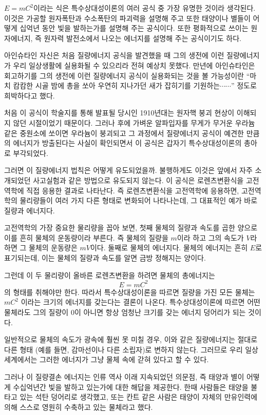 $E=mC^2$이라는 식은 특수상대성이론의 여러 공식 중 가장 유명한 것이라 생각된다.
이것은
가공할 원자폭탄과 수소폭탄의 파괴력을 설명해 주고 또한 태양이나 별들이 어떻게 십억년 동안
빛을 발하는가를 설명해 주는 공식이다. 또한 평화적으로 쓰이는 원자에너지, 즉 원자력
발전소에서 나오는 에너지를 설명해 주는 공식이기도 하다.

  아인슈타인 자신은 처음 질량에너지 공식을 발견했을 때 그의 생전에 이런 질량에너지가 우리
일상생활에 실용화될 수 있으리라 전혀 예상치 못했다. 만년에 아인슈타인은 회고하기를 그의
생전에 이런 질량에너지 공식이 실용화되는 것을 볼 가능성이란 ``마치 캄캄한 시골 밤에 총을
쏘아 우연히 지나가던 새가 잡히기를 기원하는$\cdots\cdots$'' 정도로 희박하다고 했다.

  처음 이 공식이 학술지를 통해 발표될 당시인 1910년대는 원자핵 붕괴 현상이 이해되지 않던
시절이었기 때문이다. 그러나 후에 가벼운 알파입자를 무게가 무거운 우라늄 같은 중원소에
쏘이면 우라늄이 붕괴되고 그 과정에서 질량에너지 공식이 예견한 만큼의 에너지가 방출된다는
사실이 확인되면서 이 공식은 갑자기 특수상대성이론의 총아로 부각되었다.

  그러면 이 질량에너지 법칙은 어떻게 유도되었을까. 불행하게도 이것은 앞에서 자주
소개되었던 사고실험과 같은 방법으로 유도되지 않는다. 이 공식은 로렌츠변환식을 고전역학에
직접 응용한 결과로 나타난다. 즉 로렌츠변환식을 고전역학에 응용하면, 고전역학의 물리량들이
여러 가지 다른 형태로 변화되어 나타나는데, 그 대표적인 예가 바로 질량과 에너지다.

  고전역학의 가장 중요한 물리량을 꼽아 보면, 첫째 물체의 질량과 속도를 곱한 양으로 이를
흔히 물체의 운동량이라 부른다. 즉 물체의 질량을 $m$이라 하고 그의 속도가 $V$라 하면 그 물체의
운동량은 $mV$이다. 둘째로 물체의 에너지다. 물체의 에너지는 흔히 $E$로 표기되는데, 이는 물체의
질량과 속도를 알면 금방 정해지는 양이다.

  그런데 이 두 물리량이 올바른 로렌츠변환을 하려면 물체의 총에너지는
$$ E= mC^2$$
  의 형태를 취해야만 한다. 따라서 특수상대성이론을 따르면 질량을 가진 모든 물체는 $mC^2$
이라는 크기의 에너지를 갖는다는 결론이 나온다. 특수상대성이론에 따르면 어떤 물체라도 그의
질량이 0이 아니면 항상 엄청난 크기를 갖는 에너지 덩어리가 되는 것이다.

일반적으로 물체의 속도가 광속에 훨씬 못 미칠 경우, 이와 같은 질량에너지는 절대로 다른
형태 (예를 들면, 감마선이나 다른 소립자)로 변하지 않는다. 그러므로 우리 일상세계에서는
그러한 에너지가 그냥 물체 속에 갇혀 있다고 할 수 있다.

  그러나 이 질량결손 에너지는 인류 역사 이래 지속되었던 의문점, 즉 태양과 별이 어떻게
수십억년간 빛을 발하고 있는가에 대한 해답을 제공한다. 한때 사람들은 태양을 불타고 있는
석탄 덩어리로 생각했고, 또는 칸트 같은 사람은 태양이 자체의 만유인력에 의해 스스로 영원히
수축하고 있는 물체라고 했다.

